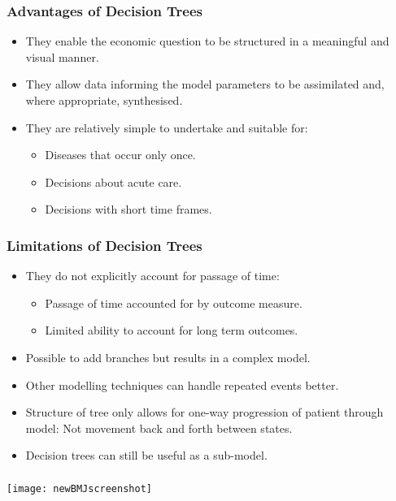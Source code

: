 \begin{frame}
\frametitle{Advantages of Decision Trees}

	\begin{itemize}
		\item They enable the economic question to be structured in a \alert{meaningful} and \alert{visual} manner.
		\pause
		\item  They allow data informing the model parameters to be assimilated and, where appropriate, synthesised.
		\pause
		\item They are relatively simple to undertake and suitable for:
		\begin{itemize}
			\item Diseases that occur only once.
			\item Decisions about acute care.
			\item Decisions with short time frames.
		\end{itemize}
	\end{itemize}
\end{frame}


\begin{frame}
\frametitle{Limitations of Decision Trees}

	\begin{itemize}
		\item They do not explicitly account for passage of time:
			\begin{itemize}
				\item Passage of time accounted for by outcome measure.
				\item Limited ability to account for long term outcomes.
			\end{itemize}
			\pause
		\item Possible to add branches but results in a complex model.
		\item Other modelling techniques can handle repeated events better.
		\item Structure of tree only allows for one-way progression of patient through model: Not movement back and forth between states.
		\item Decision trees can still be useful as a sub-model.
		\end{itemize}
\end{frame}


\begin{frame}
\frametitle{}
 \texttt{[image: newBMJscreenshot]}
\end{frame} 

